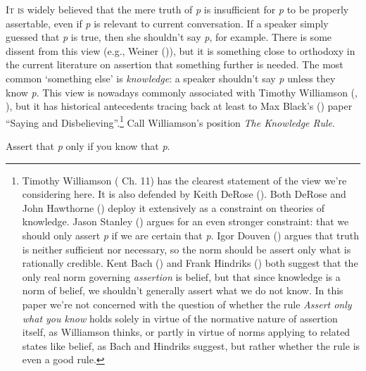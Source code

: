 \documentclass[
  11pt,
  letterpaper,
  DIV=11,
  numbers=noendperiod,
  twoside]{scrartcl}
\providecommand{\tightlist}{%
  \setlength{\itemsep}{0pt}\setlength{\parskip}{0pt}}
\begin{document}
\lettrine{I}{t is} widely believed that the mere truth of \emph{p} is
insufficient for \emph{p} to be properly assertable, even if \emph{p} is
relevant to current conversation. If a speaker simply guessed that
\emph{p} is true, then she shouldn't say \emph{p}, for example. There is
some dissent from this view (e.g., Weiner
()), but it is something close to
orthodoxy in the current literature on assertion that something further
is needed. The most common `something else' is \emph{knowledge}: a
speaker shouldn't say \emph{p} unless they know \emph{p}. This view is
nowadays commonly associated with Timothy Williamson
(,
), but it has historical
antecedents tracing back at least to Max Black's
() paper ``Saying and
Disbelieving''.\footnote{Timothy Williamson
  ( Ch. 11) has the
  clearest statement of the view we're considering here. It is also
  defended by Keith DeRose (). Both
  DeRose and John Hawthorne () deploy
  it extensively as a constraint on theories of knowledge. Jason Stanley
  () argues for an even stronger
  constraint: that we should only assert \emph{p} if we are certain that
  \emph{p}. Igor Douven () argues that
  truth is neither sufficient nor necessary, so the norm should be
  assert only what is rationally credible. Kent Bach
  () and Frank Hindriks
  () both suggest that the only real
  norm governing \emph{assertion} is belief, but that since knowledge is
  a norm of belief, we shouldn't generally assert what we do not know.
  In this paper we're not concerned with the question of whether the
  rule \emph{Assert only what you know} holds solely in virtue of the
  normative nature of assertion itself, as Williamson thinks, or partly
  in virtue of norms applying to related states like belief, as Bach and
  Hindriks suggest, but rather whether the rule is even a good rule.}
Call Williamson's position \emph{The Knowledge Rule}.

\begin{description}
\tightlist
\item[The Knowledge Rule]
Assert that \emph{p} only if you know that \emph{p}.
\end{description}
\end{document}
